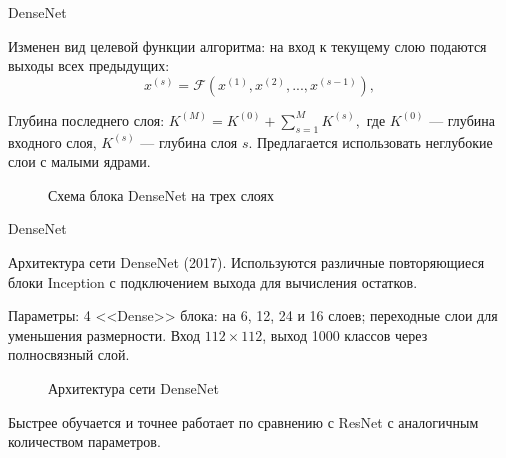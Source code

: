 \documentclass[11pt, intlimits]{beamer}
\begin{document}
\begin{frame}{DenseNet}

Изменен вид целевой функции алгоритма: на вход к текущему слою подаются выходы всех предыдущих:
$$
x^{(s)}=\mathcal{F}(x^{(1)}, x^{(2)}, ..., x^{(s-1)}),
$$

Глубина последнего слоя:
$
K^{(M)}=K^{(0)} + \sum_{s=1}^M K^{(s)},
$
где $K^{(0)}$ --- глубина входного слоя, $K^{(s)}$ --- глубина слоя $s$. Предлагается использовать неглубокие слои с малыми ядрами.

\begin{figure}[h]
\caption{Схема блока DenseNet на трех слоях}
\label{img:densenet0}
\end{figure}

\end{frame}


\begin{frame}{DenseNet}

Архитектура сети DenseNet (2017). Используются различные повторяющиеся блоки Inception с подключением выхода для вычисления остатков.

Параметры: 4 <<Dense>> блока: на 6, 12, 24 и 16 слоев; переходные слои для уменьшения размерности. Вход $112 \times 112$, выход 1000 классов через полносвязный слой.

\begin{figure}[h]
\caption{Архитектура сети DenseNet}
\label{img:densenet1}
\end{figure}

Быстрее обучается и точнее работает по сравнению с ResNet с аналогичным количеством параметров.
 
\end{frame}
\end{document}

